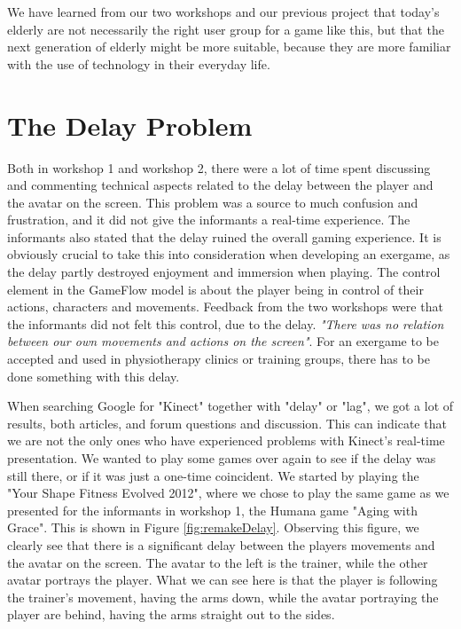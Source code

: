 We have learned from our two workshops and our previous project \cite{project} that today's elderly are not necessarily the right user group for a game like this, but that the next generation of elderly might be more suitable, because they are more familiar with the use of technology in their everyday life. 
 
\section{The Delay Problem}
\label{sec:delay}
Both in workshop 1 and workshop 2, there were a lot of time spent discussing and commenting technical aspects related to the delay between the player and the avatar on the screen. This problem was a source to much confusion and frustration, and it did not give the informants a real-time experience. The informants also stated that the delay ruined the overall gaming experience. It is obviously crucial to take this into consideration when developing an exergame, as the delay partly destroyed enjoyment and immersion when playing. The control element in the GameFlow model \cite{sweetser} is about the player being in control of their actions, characters and movements. Feedback from the two workshops were that the informants did not felt this control, due to the delay. \emph{"There was no relation between our own movements and actions on the screen"}. For an exergame to be accepted and used in physiotherapy clinics or training groups, there has to be done something with this delay. 

When searching Google for "Kinect" together with "delay" or "lag", we got a lot of results, both articles, and forum questions and discussion. This can indicate that we are not the only ones who have experienced problems with Kinect's real-time presentation. We wanted to play some games over again to see if the delay was still there, or if it was just a one-time coincident. We started by playing the "Your Shape Fitness Evolved 2012", where we chose to play the same game as we presented for the informants in workshop 1, the Humana game "Aging with Grace". This is shown in Figure \ref{fig:remakeDelay}. Observing this figure, we clearly see that there is a significant delay between the players movements and the avatar on the screen. The avatar to the left is the trainer, while the other avatar portrays the player. What we can see here is that the player is following the trainer's movement, having the arms down, while the avatar portraying the player are behind, having the arms straight out to the sides.

